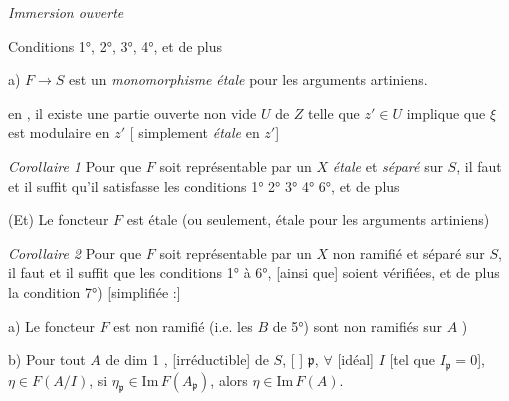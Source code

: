 \documentclass[11pt,a4paper]{article}
\begin{document}
\emph{Immersion ouverte}

Conditions  1°, 2°, 3°, 4°, et de plus

a) $F \to S$ est un \emph{monomorphisme} \emph{étale} pour les arguments
artiniens.

en , il existe une partie ouverte non vide $U$ de $Z$ telle que
$z' \in U$ implique que $\xi$ est  modulaire en $z'$
[ simplement \emph{étale} en $z'$]

\emph{Corollaire 1} Pour que $F$ soit représentable par un $X$
\emph{étale} et \emph{séparé} sur $S$, il faut et il suffit qu'il
satisfasse les conditions  1° 2° 3° 4° 6°, et de plus

 (Et) Le foncteur $F$ est étale (ou seulement, étale pour les
arguments artiniens) 


\emph{Corollaire 2} Pour que $F$ soit représentable par un $X$ non
ramifié et séparé sur $S$, il faut et il suffit que les conditions 1° à
6°,  \struck{\ill{}} [ainsi que] soient vérifiées, et de plus
la condition 7°) [simplifiée :]


a) Le foncteur $F$ est non ramifié (i.e. les $B$ de 5°) sont non ramifiés
sur $A$ )

b) Pour tout $A$ \struck{\ill{} \ill{}} de dim 1 \struck{\ill{}
\ill{}}, [irréductible] de $S$,  [
\ill{}]  \ill{} $\mathfrak{p}$, \struck{\ill{}}
$\forall$ \struck{\ill{}} [idéal] $I$ [tel que $I_{\mathfrak{p}} = 0$],
\struck{\ill{}} $\eta \in F(A/I)$, si
$\eta_{\mathfrak{p}} \in \mathrm{Im}\, F(A_{\mathfrak{p}})$, alors
$\eta \in \mathrm{Im}\, F(A)$.

\end{document}
